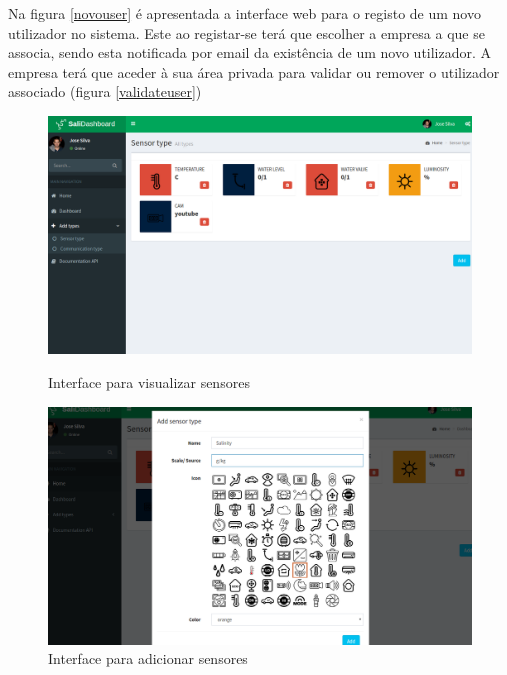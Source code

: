 Na figura \ref{novouser} é apresentada a interface web para o registo de um novo utilizador no sistema. Este ao registar-se terá que escolher a empresa a que se associa, sendo esta notificada por email da existência de um novo utilizador. A empresa terá que aceder à sua área privada para validar ou remover o utilizador associado (figura \ref{validateuser})



\begin{figure}[h]
	\centering
	\begin{minipage}[b]{0.49\textwidth}
		\centering
		\includegraphics[width=\textwidth]{prints-web/sensor_show.png}
		\caption{Interface para visualizar sensores}
		\label{view-sensorall}
	\end{minipage}
	\hfill
	\begin{minipage}[b]{0.49\textwidth}
		\centering
		\includegraphics[width=\textwidth]{prints-web/sensor_add.png}
		\caption{ Interface para adicionar sensores}
		\label{add-sensorall}
	\end{minipage}
\end{figure}


